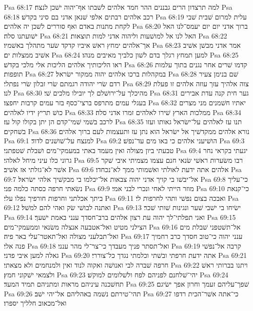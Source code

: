 Psa 68:17  למה תרצדון הרים גבננים ההר חמד אלהים לשׁבתו אף־יהוה ישׁכן לנצח׃
Psa 68:18  רכב אלהים רבתים אלפי שׁנאן אדני בם סיני בקדשׁ׃
Psa 68:19  עלית למרום שׁבית שׁבי לקחת מתנות באדם ואף סוררים לשׁכן יה אלהים׃
Psa 68:20  ברוך אדני יום יום יעמס־לנו האל ישׁועתנו סלה׃
Psa 68:21  האל לנו אל למושׁעות וליהוה אדני למות תוצאות׃
Psa 68:22  אך־אלהים ימחץ ראשׁ איביו קדקד שׂער מתהלך באשׁמיו׃
Psa 68:23  אמר אדני מבשׁן אשׁיב אשׁיב ממצלות ים׃
Psa 68:24  למען תמחץ רגלך בדם לשׁון כלביך מאיבים מנהו׃
Psa 68:25  ראו הליכותיך אלהים הליכות אלי מלכי בקדשׁ׃
Psa 68:26  קדמו שׁרים אחר נגנים בתוך עלמות תופפות׃
Psa 68:27  במקהלות ברכו אלהים יהוה ממקור ישׂראל׃
Psa 68:28  שׁם בנימן צעיר רדם שׂרי יהודה רגמתם שׂרי זבלון שׂרי נפתלי׃
Psa 68:29  צוה אלהיך עזך עוזה אלהים זו פעלת לנו׃
Psa 68:30  מהיכלך על־ירושׁלם לך יובילו מלכים שׁי׃
Psa 68:31  גער חית קנה עדת אבירים בעגלי עמים מתרפס ברצי־כסף בזר עמים קרבות יחפצו׃
Psa 68:32  יאתיו חשׁמנים מני מצרים כושׁ תריץ ידיו לאלהים׃
Psa 68:33  ממלכות הארץ שׁירו לאלהים זמרו אדני סלה׃
Psa 68:34  לרכב בשׁמי שׁמי־קדם הן יתן בקולו קול עז׃
Psa 68:35  תנו עז לאלהים על־ישׂראל גאותו ועזו בשׁחקים׃
Psa 68:36  נורא אלהים ממקדשׁיך אל ישׂראל הוא נתן עז ותעצמות לעם ברוך אלהים׃
Psa 69:1  למנצח על־שׁושׁנים לדוד׃
Psa 69:2  הושׁיעני אלהים כי באו מים עד־נפשׁ׃
Psa 69:3  טבעתי ביון מצולה ואין מעמד באתי במעמקי־מים ושׁבלת שׁטפתני׃
Psa 69:4  יגעתי בקראי נחר גרוני כלו עיני מיחל לאלהי׃
Psa 69:5  רבו משׂערות ראשׁי שׂנאי חנם עצמו מצמיתי איבי שׁקר אשׁר לא־גזלתי אז אשׁיב׃
Psa 69:6  אלהים אתה ידעת לאולתי ואשׁמותי ממך לא־נכחדו׃
Psa 69:7  אל־יבשׁו בי קויך אדני יהוה צבאות אל־יכלמו בי מבקשׁיך אלהי ישׂראל׃
Psa 69:8  כי־עליך נשׂאתי חרפה כסתה כלמה פני׃
Psa 69:9  מוזר הייתי לאחי ונכרי לבני אמי׃
Psa 69:10  כי־קנאת ביתך אכלתני וחרפות חורפיך נפלו עלי׃
Psa 69:11  ואבכה בצום נפשׁי ותהי לחרפות לי׃
Psa 69:12  ואתנה לבושׁי שׂק ואהי להם למשׁל׃
Psa 69:13  ישׂיחו בי ישׁבי שׁער ונגינות שׁותי שׁכר׃
Psa 69:14  ואני תפלתי־לך יהוה עת רצון אלהים ברב־חסדך ענני באמת ישׁעך׃
Psa 69:15  הצילני מטיט ואל־אטבעה אנצלה משׂנאי וממעמקי־מים׃
Psa 69:16  אל־תשׁטפני שׁבלת מים ואל־תבלעני מצולה ואל־תאטר־עלי באר פיה׃
Psa 69:17  ענני יהוה כי־טוב חסדך כרב רחמיך פנה אלי׃
Psa 69:18  ואל־תסתר פניך מעבדך כי־צר־לי מהר ענני׃
Psa 69:19  קרבה אל־נפשׁי גאלה למען איבי פדני׃
Psa 69:20  אתה ידעת חרפתי ובשׁתי וכלמתי נגדך כל־צוררי׃
Psa 69:21  חרפה שׁברה לבי ואנושׁה ואקוה לנוד ואין ולמנחמים ולא מצאתי׃
Psa 69:22  ויתנו בברותי ראשׁ ולצמאי ישׁקוני חמץ׃
Psa 69:23  יהי־שׁלחנם לפניהם לפח ולשׁלומים למוקשׁ׃
Psa 69:24  תחשׁכנה עיניהם מראות ומתניהם תמיד המעד׃
Psa 69:25  שׁפך־עליהם זעמך וחרון אפך ישׂיגם׃
Psa 69:26  תהי־טירתם נשׁמה באהליהם אל־יהי ישׁב׃
Psa 69:27  כי־אתה אשׁר־הכית רדפו ואל־מכאוב חלליך יספרו׃
